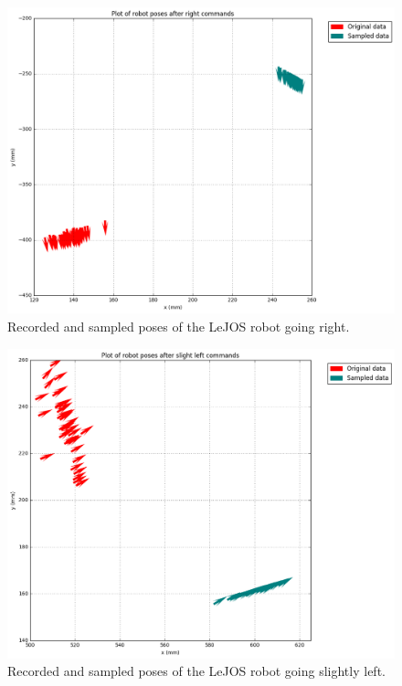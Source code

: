 \documentclass[paper=a4, fontsize=11pt]{scrartcl} %
\begin{document}
\begin{figure}[h!]
    \begin{center}
        \setlength{\fboxsep}{0.5pt} %
        \setlength{\fboxrule}{0.5pt}
        \includegraphics[width=13.5cm,fbox]{images/sampled_poses_right.png}
        \caption{Recorded and sampled poses of the LeJOS robot going right.}
    \end{center}
\end{figure}

\begin{figure}[h!]
    \begin{center}
        \setlength{\fboxsep}{0.5pt} %
        \setlength{\fboxrule}{0.5pt}
        \includegraphics[width=13.5cm,fbox]{images/sampled_poses_slightLeft.png}
        \caption{Recorded and sampled poses of the LeJOS robot going slightly left.}
    \end{center}
\end{figure}
\end{document}
